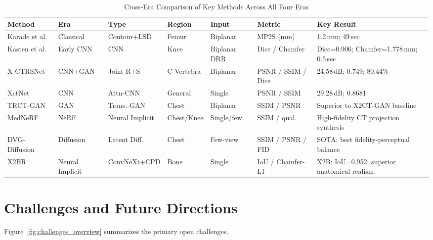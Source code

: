 \documentclass[10pt,twocolumn,a4paper]{article}
\begin{document}
\begin{table}[t]
\caption{Cross-Era Comparison of Key Methods Across All Four Eras}
\label{tab:crossera}
\centering\small
\setlength{\tabcolsep}{4pt}
\begin{tabular}{@{}lllllp{2.5cm}p{3.0cm}@{}}
\toprule
\textbf{Method} & \textbf{Era} & \textbf{Type} & \textbf{Region} &
\textbf{Input} & \textbf{Metric} & \textbf{Key Result}\\
\midrule
Karade et al.~\cite{karade2015} & Classical & Contour+LSD & Femur &
  Biplanar & MP2S (mm) & 1.2\,mm; 49\,sec\\
Kasten et al.~\cite{kasten2020} & Early CNN & CNN & Knee &
  Biplanar DRR & Dice / Chamfer & Dice=0.906; Chamfer=1.778\,mm; 0.5\,sec\\
X-CTRSNet~\cite{xctrsnet} & CNN+GAN & Joint R+S & C-Vertebra &
  Biplanar & PSNR / SSIM / Dice & 24.58\,dB; 0.749; 80.44\%\\
XctNet~\cite{xctnet} & CNN & Attn-CNN & General &
  Single & PSNR / SSIM & 29.28\,dB; 0.8681\\
TRCT-GAN~\cite{trctgan} & GAN & Trans.-GAN & Chest &
  Biplanar & SSIM / PSNR & Superior to X2CT-GAN baseline\\
MedNeRF~\cite{mednerf} & NeRF & Neural Implicit & Chest/Knee &
  Single/few & SSIM / qual. & High-fidelity CT projection synthesis\\
DVG-Diffusion~\cite{dvgdiffusion} & Diffusion & Latent Diff. & Chest &
  Few-view & SSIM / PSNR / FID & SOTA; best fidelity-perceptual balance\\
X2BR~\cite{x2br} & Neural Implicit & ConvNeXt+CPD & Bone &
  Single & IoU / Chamfer-L1 & X2B: IoU=0.952; superior anatomical realism\\
\bottomrule
\end{tabular}
\end{table}

\section{Challenges and Future Directions}
\label{sec:challenges}

Figure~\ref{fig:challenges_overview} summarizes the primary open challenges.
\end{document}
